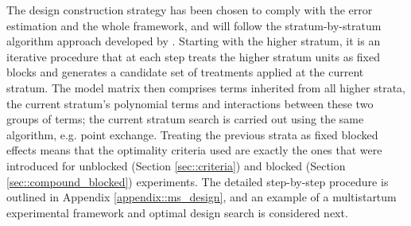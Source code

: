 The design construction strategy has been chosen to comply with the error estimation and the whole framework, and will follow the stratum-by-stratum algorithm approach developed by \cite{Trinca2015improved}. Starting with the higher stratum, it is an iterative procedure that at each step treats the higher stratum units as fixed blocks and generates a candidate set of treatments applied at the current stratum.  The model matrix then comprises terms inherited from all higher strata, the current stratum's polynomial terms and interactions between these two groups of terms; the current stratum search is carried out using the same algorithm, e.g. point exchange. Treating the previous strata as fixed blocked effects means that the optimality criteria used are exactly the ones that were introduced for unblocked (Section \ref{sec::criteria}) and blocked (Section \ref{sec::compound_blocked}) experiments.
The detailed step-by-step procedure is outlined in Appendix \ref{appendix::ms_design}, and an example of a multistartum experimental framework and optimal design search is considered next.

